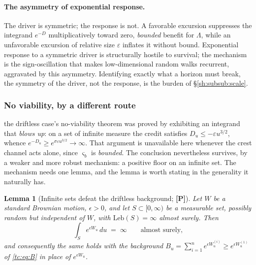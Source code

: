 \documentclass[11pt]{article}
\numberwithin{equation}{section}
\theoremstyle{plain}
\newtheorem{lemma}[theorem]{Lemma}
\theoremstyle{definition}
\theoremstyle{remark}
\begin{document}
\paragraph{The asymmetry of exponential response.}\label{sh:rem:asym}
The driver is symmetric; the response is not. A favorable excursion
suppresses the integrand $e^{-D}$ multiplicatively toward zero, \emph{bounded} benefit for $\Lambda$, while an unfavorable excursion of
relative size $\varepsilon$ inflates it without bound. Exponential response
to a symmetric driver is structurally hostile to survival; the mechanism is
the sign-oscillation that makes low-dimensional random walks recurrent,
aggravated by this asymmetry. Identifying exactly what a horizon must break, the symmetry of the driver, not the response, is the burden of
\S\ref{sh:subsub:scale}.

\subsubsection{No viability, by a different route}\label{tc:subsub:noviab}

the driftless case's no-viability theorem was proved by exhibiting an integrand
that \emph{blows up}: on a set of infinite measure the credit satisfies
$D_u\le-\varepsilon u^{3/2}$, whence $e^{-D_u}\ge
e^{\sigma\varepsilon u^{3/2}}\to\infty$. That argument is unavailable
here whenever the crest channel acts alone, since $\varsigma_b$ is
\emph{bounded}. The conclusion nevertheless survives, by a weaker and
more robust mechanism: a positive floor on an infinite set. The
mechanism needs one lemma, and the lemma is worth stating in the
generality it naturally has.

\begin{lemma}[Infinite sets defeat the driftless background;
\textbf{[P]}]\label{tc:lem:infbackground}
Let $W$ be a standard Brownian motion, $\epsilon>0$, and let
$S\subset[0,\infty)$ be a measurable set, possibly random but
independent of $W$, with $\mathrm{Leb}(S)=\infty$ almost surely. Then
\[
\int_S e^{\epsilon W_u}\,du\;=\;\infty\qquad\text{almost surely,}
\]
and consequently the same holds with the background
$B_u=\sum_{i=1}^n e^{\epsilon W^{(i)}_u}\ge e^{\epsilon W^{(1)}_u}$
of \eqref{tc:eq:B} in place of $e^{\epsilon W_u}$.
\end{lemma}
\end{document}
